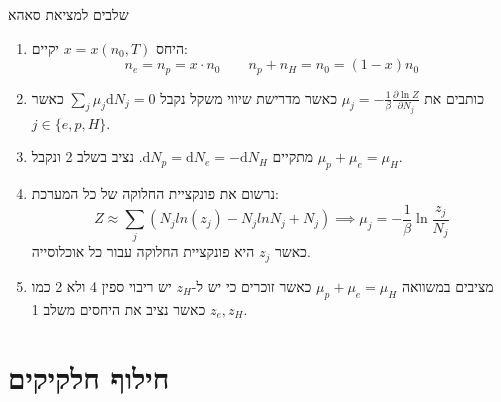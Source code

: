 \documentclass{tstextbook}
\begin{document}
\begin{summary}
שלבים למציאת סאהא

  \begin{enumerate}
    \item היחס \(x=x(n_{0},T)\) יקיים: 
$$n_{e}=n_{p}=x\cdot n_{0}\qquad n_{p}+n_{H}=n_{0}=(1-x)n_{0}$$


    \item כותבים את \(\mu_{j}=-\frac{1}{\beta}\frac{\partial \ln Z}{\partial N_{j}}\) כאשר מדרישת שיווי משקל נקבל \(\sum_{j}\mu_{j}\mathrm{d}N_{j}=0\) כאשר \(j \in \{ e,p,H \}\).  


    \item מתקיים \(\mathrm{d}N_{p}=\mathrm{d}N_{e}=-\mathrm{d}N_{H}\). נציב בשלב 2 ונקבל \(\mu_{p}+\mu_{e}=\mu_{H}\). 


    \item נרשום את פונקציית החלוקה של כל המערכת: 
$$Z\approx\sum_{j}\left(N_{j}l n\left(z_{j}\right)-N_{j}l n N_{j}+N_{j}\right)\implies \mu_{j}=-\frac{1}{\beta}\ln \frac{z_{j}}{N_{j}}$$
כאשר \(z_{j}\) היא פונקציית החלוקה עבור כל אוכלוסייה.


    \item מציבים במשוואה \(\mu_{p}+\mu_{e}=\mu_{H}\) כאשר זוכרים כי יש ל-\(z_{H}\) יש ריבוי ספין 4 ולא 2 כמו \(z_{e},z_{H}\) כאשר נציב את היחסים משלב 1. 


  \end{enumerate}
\end{summary}

\section{חילוף חלקיקים}
\end{document}
